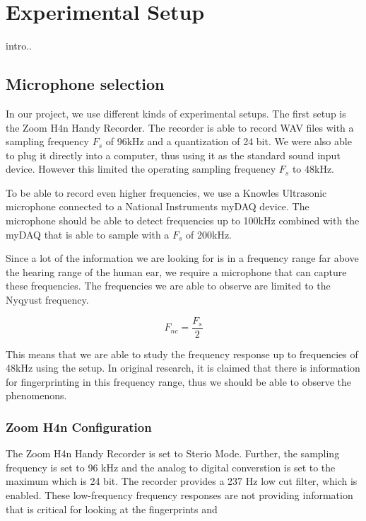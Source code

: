 \chapter{Experimental Setup}
\label{chp:experimental_setup} 

intro..

\section{Microphone selection}\label{sec:ch3_microphone_selection}

In our project, we use different kinds of experimental setups. 
The first setup is the Zoom H4n Handy Recorder. 
The recorder is able to record WAV files with a sampling frequency \( {F_{s}} \) of 96kHz and a quantization of 24 bit. We were also able to plug it directly into a computer, thus using it as the standard sound input device. 
However this limited the operating sampling frequency \( {F_{s}} \) to 48kHz.

To be able to record even higher frequencies, we use a Knowles Ultrasonic microphone connected to a National Instruments myDAQ device. 
The microphone should be able to detect frequencies up to 100kHz combined with the myDAQ that is able to sample with a \( {F_{s}} \) of 200kHz.

Since a lot of the information we are looking for is in a frequency range far above the hearing range of the human ear, we require a microphone that can capture these frequencies. 
The frequencies we are able to observe are limited to the Nyqyust frequency.

\begin{equation}\label{eq:ch3_nyquist_frequency}
F_{nc} = \frac{F_{s}}{2}
\end{equation}

This means that we are able to study the frequency response up to frequencies of 48kHz using the setup.
In original research, it is claimed that there is information for fingerprinting in this frequency range, thus we should be able to observe the phenomenons.

\subsection{Zoom H4n Configuration}\label{sec:ch3_zoom_H4n_configuration}

The Zoom H4n Handy Recorder is set to Sterio Mode.
Further, the sampling frequency is set to 96 kHz and the analog to digital converstion is set to the maximum which is 24 bit.
The recorder provides a 237 Hz low cut filter, which is enabled.
These low-frequency frequency responses are not providing information that is critical for looking at the fingerprints and   

